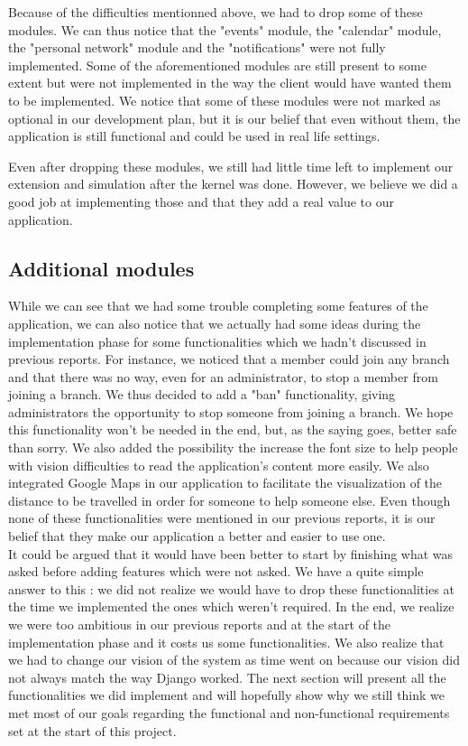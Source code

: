 \documentclass[11pt, a4paper]{article}      %
\begin{document}
Because of the difficulties mentionned above, we had to drop some of these modules. We can thus notice that the "events" module, the "calendar" module, the "personal network" module and the "notifications" were not fully implemented. Some of the aforementioned modules are still present to some extent but were not implemented in the way the client would have wanted them to be implemented. We notice that some of these modules were not marked as optional in our development plan, but it is our belief that even without them, the application is still functional and could be used in real life settings. 

Even after dropping these modules, we still had little time left to implement our extension and simulation after the kernel was done. However, we believe we did a good job at implementing those and that they add a real value to our application.

\subsection{Additional modules}
While we can see that we had some trouble completing some features of the application, we can also notice that we actually had some ideas during the implementation phase for some functionalities which we hadn't discussed in previous reports. For instance, we noticed that a member could join any branch and that there was no way, even for an administrator, to stop a member from joining a branch. We thus decided to add a "ban" functionality, giving administrators the opportunity to stop someone from joining a branch. We hope this functionality won't be needed in the end, but, as the saying goes, better safe than sorry. We also added the possibility the increase the font size to help people with vision difficulties to read the application's content more easily.  We also integrated Google Maps in our application to facilitate the visualization of the distance to be travelled in order for someone to help someone else. Even though none of these functionalities were mentioned in our previous reports, it is our belief that they make our application a better and easier to use one.\\

It could be argued that it would have been better to start by finishing what was asked before adding features which were not asked. We have a quite simple answer to this : we did not realize we would have to drop these functionalities at the time we implemented the ones which weren't required. In the end, we realize we were too ambitious in our previous reports and at the start of the implementation phase and it costs us some functionalities. We also realize that we had to change our vision of the system as time went on because our vision did not always match the way Django worked. The next section will present all the functionalities we did implement and will hopefully show why we still think we met most of our goals regarding the functional and non-functional requirements set at the start of this project.
\end{document}

